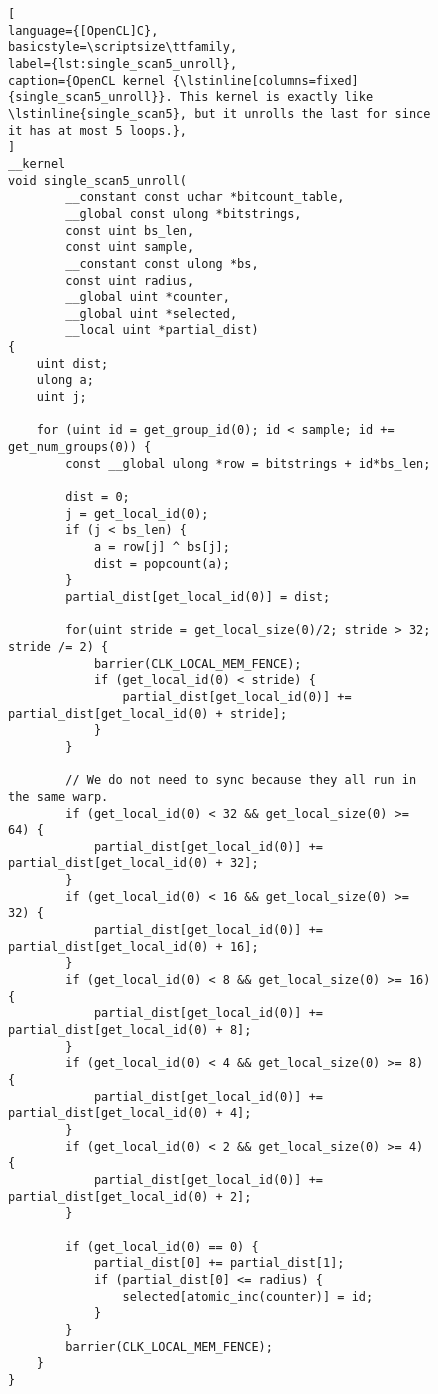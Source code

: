 \begin{figure}[!p]
\begin{lstlisting}[
language={[OpenCL]C},
basicstyle=\scriptsize\ttfamily,
label={lst:single_scan5_unroll},
caption={OpenCL kernel {\lstinline[columns=fixed]{single_scan5_unroll}}. This kernel is exactly like \lstinline{single_scan5}, but it unrolls the last for since it has at most 5 loops.},
]
__kernel
void single_scan5_unroll(
        __constant const uchar *bitcount_table,
        __global const ulong *bitstrings,
        const uint bs_len,
        const uint sample,
        __constant const ulong *bs,
        const uint radius,
        __global uint *counter,
        __global uint *selected,
        __local uint *partial_dist)
{
    uint dist;
    ulong a;
    uint j;

    for (uint id = get_group_id(0); id < sample; id += get_num_groups(0)) {
        const __global ulong *row = bitstrings + id*bs_len;

        dist = 0;
        j = get_local_id(0);
        if (j < bs_len) {
            a = row[j] ^ bs[j];
            dist = popcount(a);
        }
        partial_dist[get_local_id(0)] = dist;

        for(uint stride = get_local_size(0)/2; stride > 32; stride /= 2) {
            barrier(CLK_LOCAL_MEM_FENCE);
            if (get_local_id(0) < stride) {
                partial_dist[get_local_id(0)] += partial_dist[get_local_id(0) + stride];
            }
        }

        // We do not need to sync because they all run in the same warp.
        if (get_local_id(0) < 32 && get_local_size(0) >= 64) {
            partial_dist[get_local_id(0)] += partial_dist[get_local_id(0) + 32];
        }
        if (get_local_id(0) < 16 && get_local_size(0) >= 32) {
            partial_dist[get_local_id(0)] += partial_dist[get_local_id(0) + 16];
        }
        if (get_local_id(0) < 8 && get_local_size(0) >= 16) {
            partial_dist[get_local_id(0)] += partial_dist[get_local_id(0) + 8];
        }
        if (get_local_id(0) < 4 && get_local_size(0) >= 8) {
            partial_dist[get_local_id(0)] += partial_dist[get_local_id(0) + 4];
        }
        if (get_local_id(0) < 2 && get_local_size(0) >= 4) {
            partial_dist[get_local_id(0)] += partial_dist[get_local_id(0) + 2];
        }

        if (get_local_id(0) == 0) {
            partial_dist[0] += partial_dist[1];
            if (partial_dist[0] <= radius) {
                selected[atomic_inc(counter)] = id;
            }
        }
        barrier(CLK_LOCAL_MEM_FENCE);
    }
}
\end{lstlisting}
\end{figure}

